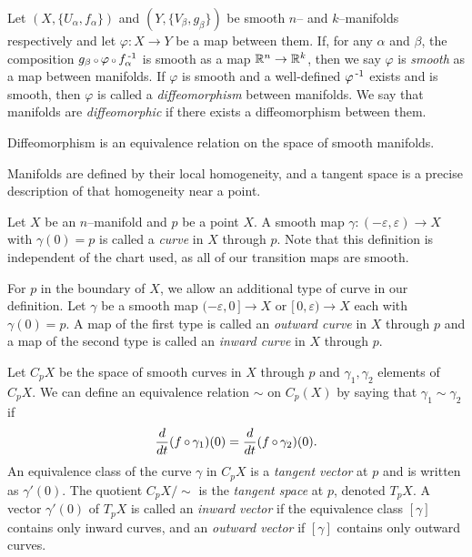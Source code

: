 \begin{defn}
	\label{def:smoothmap}
	Let $(X,\{U_\alpha,f_\alpha\})$ and $(Y,\{V_\beta,g_\beta\})$ be smooth $n$-- and $k$--manifolds respectively and let $\varphi:X\to Y$ be a map between them.
	If, for any $\alpha$ and $\beta$, the composition $g_\beta\comp \varphi\comp f_\alpha\inv$ is smooth as a map $\mathbb{R}^n\to\mathbb{R}^k$, then we say $\varphi$ is \emph{smooth} as a map between manifolds.
	If $\varphi$ is smooth and a well-defined $\varphi^{\,\text{-}1}$ exists and is smooth, then $\varphi$ is called a \emph{diffeomorphism} between manifolds.
	We say that manifolds are \emph{diffeomorphic} if there exists a diffeomorphism between them.
\end{defn}

\begin{prop}
	\label{prop:diffeoequiv}
	Diffeomorphism is an equivalence relation on the space of smooth manifolds.
\end{prop}

Manifolds are defined by their local homogeneity, and a tangent space is a precise description of that homogeneity near a point.

\begin{defn}
	\label{def:tangentspace}
	Let $X$ be an $n$--manifold and $p$ be a point  $X$.
	A smooth map $\gamma:(-\varepsilon,\varepsilon)\to X$ with $\gamma(0)=p$ is called a \emph{curve} in $X$ through $p$.
	Note that this definition is independent of the chart used, as all of our transition maps are smooth.
	
	For $p$ in the boundary of $X$, we allow an additional type of curve in our definition.
	Let $\gamma$ be a smooth map $(-\varepsilon,0\,] \to X$ or $[\,0,\varepsilon) \to X$ each with $\gamma(0)=p$.
	A map of the first type is called an \emph{outward curve} in $X$ through $p$ and a map of the second type is called an \emph{inward curve} in $X$ through $p$.
	
	Let $C_p X$ be the space of smooth curves in $X$ through $p$ and $\gamma_1, \gamma_2$ elements of $C_p X$.
	We can define an equivalence relation $\sim$ on $C_p(X)$ by saying that $\gamma_1\sim\gamma_2$ if
	\[
		\Ddt(f\comp\gamma_1)(0) = \Ddt(f\comp\gamma_2)(0).
	\]
	An equivalence class of the curve $\gamma$ in $C_p X$ is a \emph{tangent vector} at $p$ and is written as $\gamma'(0)$.
	The quotient $C_p X/\sim$ is the \emph{tangent space} at $p$, denoted $T_p X$.
	A vector $\gamma'(0)$ of $T_p X$ is called an \emph{inward vector} if the equivalence class $[\gamma]$ contains only inward curves, and an \emph{outward vector} if $[\gamma]$ contains only outward curves.
\end{defn}


